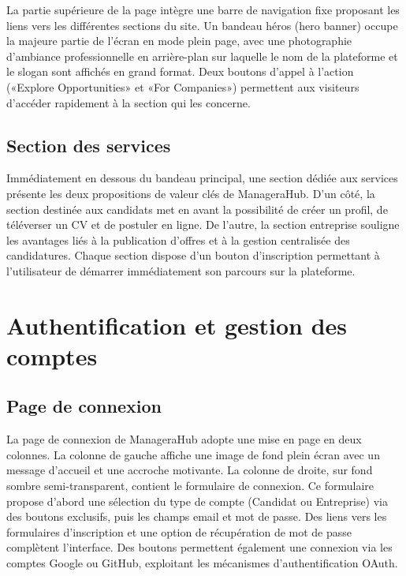\documentclass[12pt,a4paper]{report}
\begin{document}
La partie supérieure de la page intègre une barre de navigation fixe proposant les liens vers les différentes sections du site. Un bandeau héros (hero banner) occupe la majeure partie de l'écran en mode plein page, avec une photographie d'ambiance professionnelle en arrière-plan sur laquelle le nom de la plateforme et le slogan sont affichés en grand format. Deux boutons d'appel à l'action («Explore Opportunities» et «For Companies») permettent aux visiteurs d'accéder rapidement à la section qui les concerne.

\subsection{Section des services}

Immédiatement en dessous du bandeau principal, une section dédiée aux services présente les deux propositions de valeur clés de ManageraHub. D'un côté, la section destinée aux candidats met en avant la possibilité de créer un profil, de téléverser un CV et de postuler en ligne. De l'autre, la section entreprise souligne les avantages liés à la publication d'offres et à la gestion centralisée des candidatures. Chaque section dispose d'un bouton d'inscription permettant à l'utilisateur de démarrer immédiatement son parcours sur la plateforme.

\section{Authentification et gestion des comptes}

\subsection{Page de connexion}

La page de connexion de ManageraHub adopte une mise en page en deux colonnes. La colonne de gauche affiche une image de fond plein écran avec un message d'accueil et une accroche motivante. La colonne de droite, sur fond sombre semi-transparent, contient le formulaire de connexion. Ce formulaire propose d'abord une sélection du type de compte (Candidat ou Entreprise) via des boutons exclusifs, puis les champs email et mot de passe. Des liens vers les formulaires d'inscription et une option de récupération de mot de passe complètent l'interface. Des boutons permettent également une connexion via les comptes Google ou GitHub, exploitant les mécanismes d'authentification OAuth.
\end{document}
